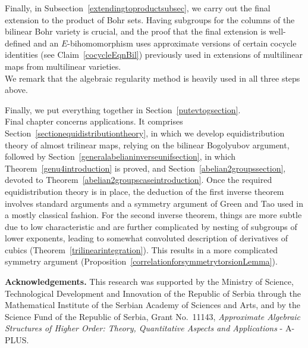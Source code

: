 \documentclass[a4paper,11pt]{article}
\numberwithin{theorem}{section}
\theoremstyle{definition}
\begin{document}
\begin{itemize}
    \phantom{a}\hspace{12pt} Finally, in Subsection~\ref{extendingtoproductsubsec}, we carry out the final extension to the product of Bohr sets. Having subgroups for the columns of the bilinear Bohr variety is crucial, and the proof that the final extension is well-defined and an $E$-bihomomorphism uses approximate versions of certain cocycle identities (see Claim~\ref{cocycleEqnBil}) previously used in extensions of multilinear maps from multilinear varieties.\\
    \phantom{a}\hspace{12pt} We remark that the algebraic regularity method is heavily used in all three steps above.
\end{itemize}
Finally, we put everything together in Section~\ref{putevtogsection}.\\

Final chapter concerns applications. It comprises Section~\ref{sectionequidistributiontheory}, in which we develop equidistribution theory of almost trilinear maps, relying on the bilinear Bogolyubov argument, followed by Section~\ref{generalabelianinverseunifsection}, in which Theorem~\ref{genu4introduction} is proved, and Section~\ref{abelian2groupssection}, devoted to Theorem~\ref{abelian2groupscaseintroduction}. Once the required equidistribution theory is in place, the deduction of the first inverse theorem involves standard arguments and a symmetry argument of Green and Tao used in a mostly classical fashion. For the second inverse theorem, things are more subtle due to low characteristic and are further complicated by nesting of subgroups of lower exponents, leading to somewhat convoluted description of derivatives of cubics (Theorem~\ref{trilinearintegration}). This results in a more complicated symmetry argument (Proposition~\ref{correlationforsymmetrytorsionLemma}).\\

\vspace{\baselineskip}


\noindent\textbf{Acknowledgements.} This research was supported by the Ministry of Science, Technological Development and Innovation of the Republic of Serbia through the Mathematical Institute of the Serbian Academy of Sciences and Arts, and by the Science Fund of the Republic of Serbia, Grant No.\ 11143, \textit{Approximate Algebraic Structures of Higher Order: Theory, Quantitative Aspects and Applications} - A-PLUS.\\

\pagebreak
\end{document}
